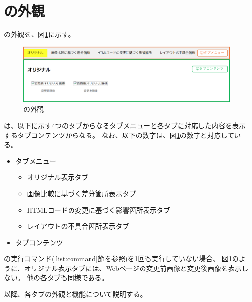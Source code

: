\section{\toolName の外観}\label{sec:MixVRT_Appearance}
\toolName の外観を、図\ref{fig: Appearance}に示す。
\begin{figure}[tp]
    \begin{center}
        \includegraphics[width=1.0\columnwidth]{image/3_Appearance3.png}
        \caption{\toolName の外観}
        \label{fig: Appearance}
    \end{center}
\end{figure}
\toolName は、以下に示す4つのタブからなるタブメニューと各タブに対応した内容を表示するタブコンテンツからなる。
なお、以下の数字は、図\ref{fig: Appearance}の数字と対応している。
\begin{itemize}
    \item[①] タブメニュー
          \begin{itemize}
              \item オリジナル表示タブ
              \item 画像比較に基づく差分箇所表示タブ
              \item HTMLコードの変更に基づく影響箇所表示タブ
              \item レイアウトの不具合箇所表示タブ
          \end{itemize}
    \item[②] タブコンテンツ
\end{itemize}
\par
\toolName の実行コマンド(\ref{list:command}節を参照)を1回も実行していない場合、
図\ref{fig: Appearance}のように、オリジナル表示タブには、Webページの変更前画像と変更後画像を表示しない。
他の各タブも同様である。
\par
以降、各タブの外観と機能について説明する。

